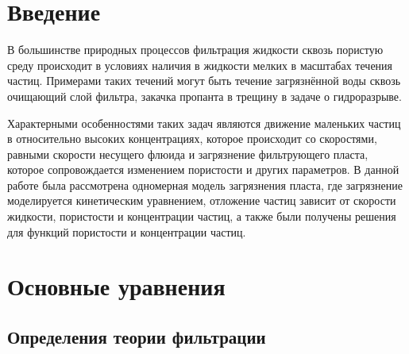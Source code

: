 \documentclass[a4paper,12pt]{article}
\begin{document}
\tableofcontents
\pagebreak


\section{Введение}

\par В большинстве природных процессов фильтрация жидкости сквозь пористую среду происходит в условиях наличия в жидкости мелких в масштабах течения частиц. Примерами таких течений могут быть течение загрязнённой воды сквозь очищающий слой фильтра, закачка пропанта в трещину в задаче о гидроразрыве.
\par Характерными особенностями таких задач являются движение маленьких частиц в относительно высоких концентрациях, которое происходит со скоростями, равными скорости несущего флюида и загрязнение фильтрующего пласта, которое сопровождается изменением пористости и других параметров. В данной работе была рассмотрена одномерная модель загрязнения пласта, где загрязнение моделируется кинетическим уравнением, отложение частиц зависит от скорости жидкости, пористости и концентрации частиц, а также были получены решения для функций пористости и концентрации частиц.

\pagebreak

\section{Основные уравнения}

\subsection{Определения теории фильтрации}
\end{document}
